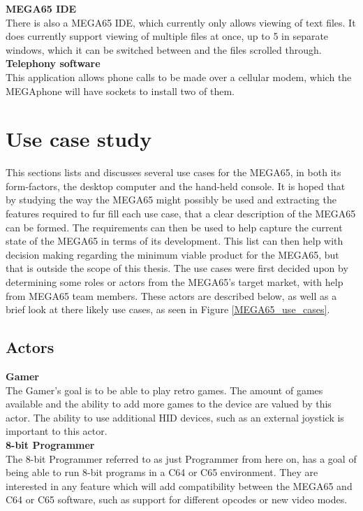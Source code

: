 \textbf{MEGA65 IDE}\\
There is also a MEGA65 IDE, which currently only allows viewing of text files. It does currently support viewing of multiple files at once, up to 5 in separate windows, which it can be switched between and the files scrolled through.\\

\textbf{Telephony software}\\
This application allows phone calls to be made over a cellular modem, which the MEGAphone will have sockets to install two of them. \\


\section{Use case study}
This sections lists and discusses several use cases for the MEGA65, in both its form-factors, the desktop computer and the hand-held console. It is hoped that by studying the way the MEGA65 might possibly be used and extracting the features required to fur fill each use case, that a clear description of the MEGA65 can be formed. The requirements can then be used to help capture the current state of the MEGA65 in terms of its development. This list can then help with decision making regarding the minimum viable product for the MEGA65, but that is outside the scope of this thesis. The use cases were first decided upon by determining some roles or actors from the MEGA65's target market, with help from MEGA65 team members. These actors are described below, as well as a brief look at there likely use cases, as seen in Figure \ref{MEGA65_use_cases}.

\subsection{Actors}
\textbf{Gamer}\\
The Gamer's goal is to be able to play retro games. The amount of games available and the ability to add more games to the device are valued by this actor. The ability to use additional HID devices, such as an external joystick is important to this actor.\\

\textbf{8-bit Programmer}\\
The 8-bit Programmer referred to as just Programmer from here on, has a goal of being able to run 8-bit programs in a C64 or C65 environment. They are interested in any feature which will add compatibility between the MEGA65 and C64 or C65 software, such as support for different opcodes or new video modes. \\

